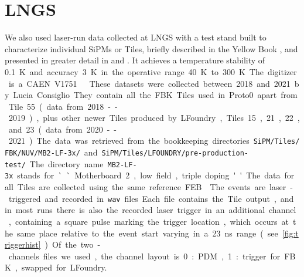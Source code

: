 
\clearpage
\section{LNGS}
\label{sec:lngsdata}


We also used laser-run data collected at LNGS with a test stand built to
characterize individual SiPMs or Tiles, briefly described in the Yellow Book
\cite[34]{aalseth2018}, and presented in greater detail in \cite{acerbi2017}
and \cite[ch.~3]{savarese2018}. It achieves a temperature stability of
\SI{0.1}K and accuracy \SI{3}{K} in the operative range \SI{40}{K} to
\SI{300}{K}. The digitizer is a CAEN V1751.



These datasets were collected between 2018 and 2021 by Lucia Consiglio. They
contain all the FBK Tiles used in Proto0 apart from Tile~55 (data from
2018--2019), plus other newer Tiles produced by LFoundry, Tiles~15, 21, 22,
and~23 (data from 2020--2021). The data was retrieved from the bookkeeping
directories \nolinkurl{SiPM/Tiles/FBK/NUV/MB2-LF-3x/} and
\nolinkurl{SiPM/Tiles/LFOUNDRY/pre-production-test/}. The directory name
\nolinkurl{MB2-LF-3x} stands for ``Motherboard 2, low field, triple doping''.
The data for all Tiles are collected using the same reference FEB.


The events are laser-triggered and recorded in \texttt{wav} files. Each file
contains the Tile output, and in most runs there is also the recorded laser
trigger in an additional channel, containing a square pulse marking the trigger
location, which occurs at the same place relative to the event start varying in
a \SI{23}{ns} range (see \autoref{fig:triggerhist}). Of the two-channels files
we used, the channel layout is 0:PDM, 1:trigger for FBK, swapped for LFoundry.

